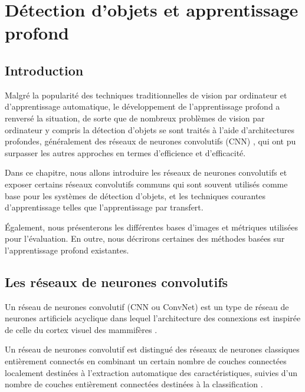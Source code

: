 \chapter{Détection d'objets et apprentissage profond}
\newpage
\pagestyle{fancy} 
\fancyhead[L]{\chaptername \ \thechapter}
\renewcommand{\headrulewidth}{1pt}
\fancyfoot[C]{\thepage}
\section{Introduction} 
Malgré la popularité des techniques traditionnelles de vision par ordinateur et d'apprentissage automatique, le développement de l'apprentissage profond a renversé la situation, de sorte que de nombreux problèmes de vision par ordinateur y compris la détection d'objets se sont traités à l'aide d'architectures profondes, généralement des réseaux de neurones convolutifs (CNN) \cite{gupta2014learning}, qui ont pu surpasser les autres approches en termes d'efficience et d'efficacité.

Dans ce chapitre, nous allons introduire les réseaux de neurones convolutifs et exposer certains réseaux convolutifs communs qui sont souvent utilisés comme base pour les systèmes de détection d'objets, et les techniques courantes d'apprentissage telles que l'apprentissage par transfert.

Également, nous présenterons  les différentes bases d'images et métriques utilisées pour l'évaluation. En outre, nous décrirons certaines des méthodes basées sur l'apprentissage profond existantes. 



\section{Les réseaux de neurones convolutifs } 

Un réseau de neurones convolutif (CNN ou ConvNet) est un type de réseau de neurones artificiels acyclique  dans lequel l'architecture des connexions est inspirée de celle du cortex visuel des mammifères \cite{Deep2018}.
 
Un réseau de neurones convolutif  est  distingué des réseaux de neurones classiques entièrement connectés en combinant un certain nombre de couches connectées localement destinées à l'extraction automatique des caractéristiques, suivies d'un nombre de couches entièrement connectées destinées à la classification \cite{Deep2016}.

